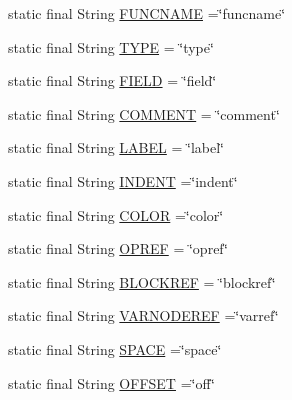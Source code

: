 \begin{DoxyCompactItemize}
\item 
static final String \mbox{\hyperlink{classghidra_1_1app_1_1decompiler_1_1_clang_x_m_l_a4c777527ea0eceaa646e10b709b33d37}{F\+U\+N\+C\+N\+A\+ME}} =\char`\"{}funcname\char`\"{}
\item 
static final String \mbox{\hyperlink{classghidra_1_1app_1_1decompiler_1_1_clang_x_m_l_a5fb36d55ba7717055ac545de1db0018b}{T\+Y\+PE}} = \char`\"{}type\char`\"{}
\item 
static final String \mbox{\hyperlink{classghidra_1_1app_1_1decompiler_1_1_clang_x_m_l_a187ccf13da951e4731b0ffaa59f433ac}{F\+I\+E\+LD}} = \char`\"{}field\char`\"{}
\item 
static final String \mbox{\hyperlink{classghidra_1_1app_1_1decompiler_1_1_clang_x_m_l_a5596831deaaceb6c901926ef835f2c52}{C\+O\+M\+M\+E\+NT}} = \char`\"{}comment\char`\"{}
\item 
static final String \mbox{\hyperlink{classghidra_1_1app_1_1decompiler_1_1_clang_x_m_l_adb973f488f74799972b2c97c5b83d692}{L\+A\+B\+EL}} = \char`\"{}label\char`\"{}
\item 
static final String \mbox{\hyperlink{classghidra_1_1app_1_1decompiler_1_1_clang_x_m_l_a3ac9b22d062d467ba5bdb517e4290322}{I\+N\+D\+E\+NT}} =\char`\"{}indent\char`\"{}
\item 
static final String \mbox{\hyperlink{classghidra_1_1app_1_1decompiler_1_1_clang_x_m_l_a0937f775b618a796312a6b973b7242e8}{C\+O\+L\+OR}} =\char`\"{}color\char`\"{}
\item 
static final String \mbox{\hyperlink{classghidra_1_1app_1_1decompiler_1_1_clang_x_m_l_aa62bcb174cd67621f2832c2dd4b03be3}{O\+P\+R\+EF}} = \char`\"{}opref\char`\"{}
\item 
static final String \mbox{\hyperlink{classghidra_1_1app_1_1decompiler_1_1_clang_x_m_l_a242662488c51385e4f0b8a8b09af8303}{B\+L\+O\+C\+K\+R\+EF}} = \char`\"{}blockref\char`\"{}
\item 
static final String \mbox{\hyperlink{classghidra_1_1app_1_1decompiler_1_1_clang_x_m_l_a6386ab78a5c2db6038aa4eb74f3c7ca3}{V\+A\+R\+N\+O\+D\+E\+R\+EF}} =\char`\"{}varref\char`\"{}
\item 
static final String \mbox{\hyperlink{classghidra_1_1app_1_1decompiler_1_1_clang_x_m_l_aac7f4d4745086588050674565f1da664}{S\+P\+A\+CE}} =\char`\"{}space\char`\"{}
\item 
static final String \mbox{\hyperlink{classghidra_1_1app_1_1decompiler_1_1_clang_x_m_l_ac55a294dc070522dbdb2de29177a859a}{O\+F\+F\+S\+ET}} =\char`\"{}off\char`\"{}
\item 

\end{DoxyCompactItemize}
